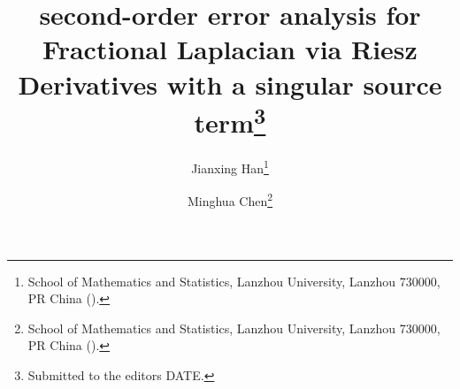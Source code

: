

\usepackage{lipsum}
\usepackage{amsfonts}
\usepackage{graphicx}
\usepackage{epstopdf}
\usepackage{algorithmic}
\ifpdf
\else
\fi

\newcommand{\creflastconjunction}{, and~}



\title{second-order error analysis for Fractional Laplacian via Riesz Derivatives with a singular source term\thanks{Submitted to the editors DATE.
}}

\author{Jianxing Han\thanks{School of Mathematics and Statistics, Lanzhou University, Lanzhou 730000, PR China
  ().}
  \and Minghua Chen\thanks{School of Mathematics and Statistics, Lanzhou University, Lanzhou 730000, PR China 
  ().}
}

\usepackage{amsopn}
\DeclareMathOperator{\diag}{diag}


